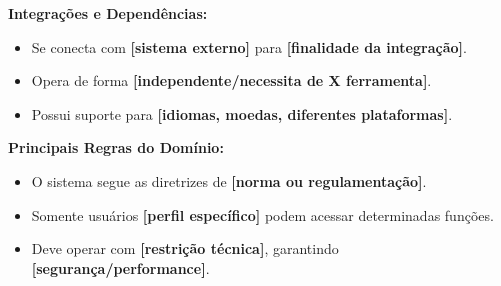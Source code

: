 \textbf{Integrações e Dependências:}
\begin{itemize}
    \item Se conecta com \textbf{[sistema externo]} para \textbf{[finalidade da integração]}.
    \item Opera de forma \textbf{[independente/necessita de X ferramenta]}.
    \item Possui suporte para \textbf{[idiomas, moedas, diferentes plataformas]}.
\end{itemize}

\textbf{Principais Regras do Domínio:}
\begin{itemize}
    \item O sistema segue as diretrizes de \textbf{[norma ou regulamentação]}.
    \item Somente usuários \textbf{[perfil específico]} podem acessar determinadas funções.
    \item Deve operar com \textbf{[restrição técnica]}, garantindo \textbf{[segurança/performance]}.
\end{itemize}

